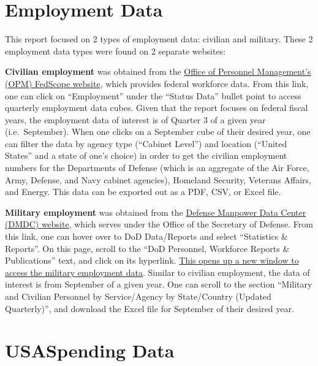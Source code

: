 \documentclass[
]{book}
\begin{document}
\hypertarget{employment-data}{%
\section{Employment Data}\label{employment-data}}

This report focused on 2 types of employment data: civilian and military. These 2 employment data types were found on 2 separate websites:

\textbf{Civilian employment} was obtained from the \href{https://www.fedscope.opm.gov/}{Office of Personnel Management's (OPM) FedScope website}, which provides federal workforce data. From this link, one can click on ``Employment'' under the ``Status Data'' bullet point to access quarterly employment data cubes. Given that the report focuses on federal fiscal years, the employment data of interest is of Quarter 3 of a given year (i.e.~September). When one clicks on a September cube of their desired year, one can filter the data by agency type (``Cabinet Level'') and location (``United States'' and a state of one's choice) in order to get the civilian employment numbers for the Departments of Defense (which is an aggregate of the Air Force, Army, Defense, and Navy cabinet agencies), Homeland Security, Veterans Affairs, and Energy. This data can be exported out as a PDF, CSV, or Excel file.

\textbf{Military employment} was obtained from the \href{https://dwp.dmdc.osd.mil/dwp/app/main}{Defense Manpower Data Center (DMDC) website}, which serves under the Office of the Secretary of Defense. From this link, one can hover over to DoD Data/Reports and select ``Statistics \& Reports''. On this page, scroll to the ``DoD Personnel, Workforce Reports \& Publications'' text, and click on its hyperlink. \href{https://dwp.dmdc.osd.mil/dwp/app/dod-data-reports/workforce-reports}{This opens up a new window to access the military employment data}. Similar to civilian employment, the data of interest is from September of a given year. One can scroll to the section ``Military and Civilian Personnel by Service/Agency by State/Country (Updated Quarterly)'', and download the Excel file for September of their desired year.

\hypertarget{usaspending-data}{%
\section{USASpending Data}\label{usaspending-data}}
\end{document}
